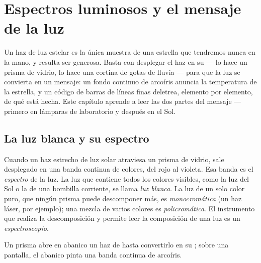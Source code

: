 \chapter{Espectros luminosos y el mensaje de la luz}\label{ch:g10:light-spectra}

Un haz de luz estelar es la única muestra de una estrella que tendremos
nunca en la mano, y resulta ser generosa. Basta con desplegar el haz en
su  --- lo hace un prisma de vidrio, lo hace una cortina de
gotas de lluvia --- para que la luz se convierta en un mensaje: un fondo
continuo de arcoíris anuncia la temperatura de la estrella, y un código
de barras de líneas finas deletrea, elemento por elemento, de qué está
hecha. Este capítulo aprende a leer las dos partes del mensaje ---
primero en lámparas de laboratorio y después en el Sol.

\section{La luz blanca y su espectro}

\begin{definition}\label{def:g10:light-spectra:white}
Cuando un haz estrecho de luz solar atraviesa un prisma de vidrio, sale
desplegado en una banda continua de colores, del rojo al violeta. Esa
banda es el \emph{espectro} de la luz. La luz que
contiene todos los colores visibles, como la luz del Sol o la de una
bombilla corriente, se llama \emph{luz blanca}. La luz
de un solo color puro, que ningún prisma puede descomponer más, es
\emph{monocromática} (un haz láser, por
ejemplo); una mezcla de varios colores es
\emph{policromática}. El instrumento que
realiza la descomposición y permite leer la composición de una luz es un
\emph{espectroscopio}.
\end{definition}

\begin{omfigure}

{\small Un prisma abre en abanico un haz de  hasta convertirlo
en su ; sobre una pantalla, el abanico pinta una banda continua
de arcoíris.}
\end{omfigure}

